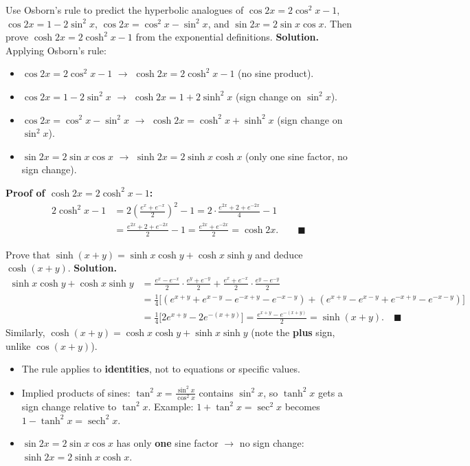 \documentclass[11pt]{article}
\begin{document}
\begin{exoresolu}
Use Osborn's rule to predict the hyperbolic analogues of $\cos 2x=2\cos^{2}x-1$, $\cos 2x=1-2\sin^{2}x$, $\cos 2x=\cos^{2}x-\sin^{2}x$, and $\sin 2x=2\sin x\cos x$. Then prove $\cosh 2x = 2\cosh^{2}x - 1$ from the exponential definitions.
\tcblower
\textbf{Solution.} Applying Osborn's rule:
\begin{itemize}
\item $\cos 2x = 2\cos^{2}x - 1$ $\to$ $\cosh 2x = 2\cosh^{2}x - 1$ (no sine product).
\item $\cos 2x = 1 - 2\sin^{2}x$ $\to$ $\cosh 2x = 1 + 2\sinh^{2}x$ (sign change on $\sin^{2}x$).
\item $\cos 2x = \cos^{2}x - \sin^{2}x$ $\to$ $\cosh 2x = \cosh^{2}x + \sinh^{2}x$ (sign change on $\sin^{2}x$).
\item $\sin 2x = 2\sin x\cos x$ $\to$ $\sinh 2x = 2\sinh x\cosh x$ (only one sine factor, no sign change).
\end{itemize}
\textbf{Proof of $\cosh 2x = 2\cosh^{2}x - 1$:}
\begin{align*}
2\cosh^{2}x-1 &= 2\left(\frac{e^{x}+e^{-x}}{2}\right)^{2}-1
= 2\cdot\frac{e^{2x}+2+e^{-2x}}{4}-1\\
&= \frac{e^{2x}+2+e^{-2x}}{2}-1
= \frac{e^{2x}+e^{-2x}}{2}
= \cosh 2x. \qquad\blacksquare
\end{align*}
\end{exoresolu}

\begin{exoresolu}
Prove that $\sinh(x+y) = \sinh x\cosh y + \cosh x\sinh y$ and deduce $\cosh(x+y)$.
\tcblower
\textbf{Solution.}
\begin{align*}
\sinh x\cosh y + \cosh x\sinh y
&= \frac{e^{x}-e^{-x}}{2}\cdot\frac{e^{y}+e^{-y}}{2} + \frac{e^{x}+e^{-x}}{2}\cdot\frac{e^{y}-e^{-y}}{2}\\
&= \frac{1}{4}\bigl[(e^{x+y}+e^{x-y}-e^{-x+y}-e^{-x-y}) + (e^{x+y}-e^{x-y}+e^{-x+y}-e^{-x-y})\bigr]\\
&= \frac{1}{4}\bigl[2e^{x+y} - 2e^{-(x+y)}\bigr] = \frac{e^{x+y}-e^{-(x+y)}}{2} = \sinh(x+y). \quad\blacksquare
\end{align*}
Similarly, $\cosh(x+y) = \cosh x\cosh y + \sinh x\sinh y$ (note the \textbf{plus} sign, unlike $\cos(x+y)$).
\end{exoresolu}

\begin{attention}
\begin{itemize}
\item The rule applies to \textbf{identities}, not to equations or specific values.
\item Implied products of sines: $\tan^{2}x = \frac{\sin^{2}x}{\cos^{2}x}$ contains $\sin^{2}x$, so $\tanh^{2}x$ gets a sign change relative to $\tan^{2}x$. Example: $1+\tan^{2}x=\sec^{2}x$ becomes $1-\tanh^{2}x=\operatorname{sech}^{2}x$.
\item $\sin 2x = 2\sin x\cos x$ has only \textbf{one} sine factor $\to$ no sign change: $\sinh 2x = 2\sinh x\cosh x$.
\end{itemize}
\end{attention}
\end{document}
